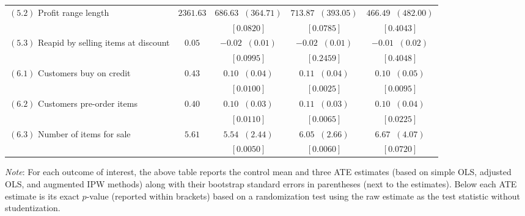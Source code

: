\begin{table}[!ht]
\begin{center}
\begin{tabular}{l|c@{\hskip 10pt}|c@{\hskip 10pt}|c@{\hskip 10pt}|c}
 $ (5.2) $ Profit range length & $ 2361.63 $ & $ 686.63  \;\; ( 364.71 ) $  & $ 713.87  \;\; ( 393.05 ) $  & $ 466.49  \;\; ( 482.00 ) $  \\ [-1mm] 
  &  & $ [ \mathbf { 0.0820 } ] $ & $ [ \mathbf { 0.0785 } ] $ & $ [  0.4043  ] $ \\ \hline 
 $ (5.3) $ Reapid by selling items at discount & $  0.05 $ & $ -0.02  \;\; (  0.01 ) $  & $ -0.02  \;\; (  0.01 ) $  & $ -0.01  \;\; (  0.02 ) $  \\ [-1mm] 
  &  & $ [ \mathbf { 0.0995 } ] $ & $ [  0.2459  ] $ & $ [  0.4048  ] $ \\ \hline 
\hline
 $ (6.1) $ Customers buy on credit & $  0.43 $ & $  0.10  \;\; (  0.04 ) $  & $  0.11  \;\; (  0.04 ) $  & $  0.10  \;\; (  0.05 ) $  \\ [-1mm] 
  &  & $ [ \mathbf { 0.0100 } ] $ & $ [ \mathbf { 0.0025 } ] $ & $ [ \mathbf { 0.0095 } ] $ \\ \hline 
 $ (6.2) $ Customers pre-order items & $  0.40 $ & $  0.10  \;\; (  0.03 ) $  & $  0.11  \;\; (  0.03 ) $  & $  0.10  \;\; (  0.04 ) $  \\ [-1mm] 
  &  & $ [ \mathbf { 0.0110 } ] $ & $ [ \mathbf { 0.0065 } ] $ & $ [ \mathbf { 0.0225 } ] $ \\ \hline 
 $ (6.3) $ Number of items for sale & $  5.61 $ & $  5.54  \;\; (  2.44 ) $  & $  6.05  \;\; (  2.66 ) $  & $  6.67  \;\; (  4.07 ) $  \\ [-1mm] 
  &  & $ [ \mathbf { 0.0050 } ] $ & $ [ \mathbf { 0.0060 } ] $ & $ [ \mathbf { 0.0720 } ] $ \\ \hline 
\hline
\end{tabular}
\end{center} \vspace{-2mm}
\noindent \scriptsize
\textit{Note}: For each outcome of interest, the above table reports the control mean and three ATE estimates (based on simple OLS, adjusted OLS, and augmented IPW methods) along with their bootstrap standard errors in parentheses (next to the estimates). Below each ATE estimate is its exact $ p$-value (reported within brackets) based on a randomization test using the raw estimate as the test statistic without studentization.
\end{table}
